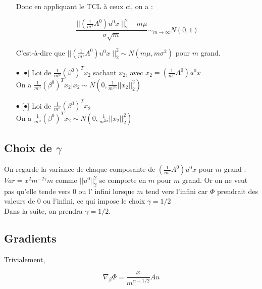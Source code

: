 \documentclass[a4paper, 11pt, french]{article}
\theoremstyle{definition}
\begin{document}
\begin{itemize}
		Donc en appliquant le TCL à ceux ci, on a :
		
		 \[
		 	\frac{|| \left(\frac{1}{m^{\gamma}} A^0 \right) u^0 x \; ||_2^2 - m \mu}{\sigma \sqrt{m}} \sim_{m \to \infty}  N(0, 1)
		 \]
		
		C'est-à-dire que $|| \left(\frac{1}{m^{\gamma}} A^0 \right) u^0 x \; ||_2^2 \sim 
		N(m \mu, m \sigma^2) $  pour $m$ grand. \\
		
		\newpage
		
		\item[$\bullet$][$\bullet$] Loi de $ \frac{1}{m^{\alpha}} (\beta^0)^T x_2 $ sachant $x_2$, avec 
		$x_2 = \left(\frac{1}{m^{\gamma}} A^0 \right) u^0 x$ \\
		
		On a 
		$ \frac{1}{m^{\alpha}} (\beta^0)^T x_2 | x_2 \sim N(0,  \frac{1}{m^{2\alpha}}||x_2||_2^2) $
		\\
		
		\item[$\bullet$][$\bullet$] Loi de $ \frac{1}{m^{\alpha}} (\beta^0)^T x_2 $ \\
		
		On a 
		$ \frac{1}{m^{\alpha}} (\beta^0)^T x_2 \sim N(0,  \frac{1}{m^{2\alpha}}||x_2||_2^2) $
		\\
		
	\end{itemize}

	\subsection{Choix de $\gamma$}
	
	On regarde la variance de chaque composante de 
	$ \left(\frac{1}{m^{\gamma}} A^0 \right) u^0 x $ pour $m$ grand : 
	$ Var = x^2 m^{-2\gamma} m $ comme $|| u^0 ||_2^2$ se comporte en $m$ pour $m$ grand. Or on ne veut pas qu'elle tende vers 0 ou l' infini lorsque $m$ tend vers l'infini car $\Phi$ prendrait des valeurs de 0 ou l'infini, ce qui impose le choix $\gamma = 1/2$ \\
	
	Dans la suite, on prendra $\gamma = 1/2$.

	\subsection{Gradients}
	
	Trivialement,
	
	\[\nabla_{\beta} \Phi = \frac{x}{m^{\alpha + 1/2}} A u\]
	
\end{document}

